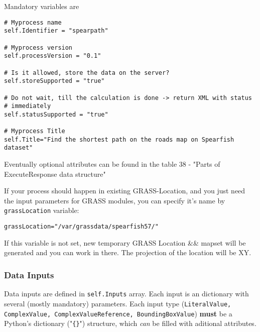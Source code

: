 \documentclass[a4paper,11pt]{article}
\begin{document}
     
    Mandatory variables are
     

    \begin{verbatim}
# Myprocess name
self.Identifier = "spearpath"

# Myprocess version
self.processVersion = "0.1"

# Is it allowed, store the data on the server?
self.storeSupported = "true"

# Do not wait, till the calculation is done -> return XML with status
# immediately
self.statusSupported = "true"

# Myprocess Title
self.Title="Find the shortest path on the roads map on Spearfish dataset"
    \end{verbatim}

     
    Eventually optional attributes can be found in the table 38 - "Parts of
    ExecuteResponse data structure"
     

     
    If your process should happen in existing GRASS-Location, and you just need
    the input parameters for GRASS modules, you can specify it's name by
    \texttt{grassLocation} variable:
     

    \begin{verbatim}
grassLocation="/var/grassdata/spearfish57/"
    \end{verbatim}

     
If this variable is not set, new temporary GRASS Location \&\& mapset will be
generated and you can work in there. The projection of the location will be
XY.
     


    \subsubsection{Data Inputs}
     
    Data inputs are defined in \texttt{self.Inputs} array. Each input is an dictionary with
    several (mostly mandatory) parameters. Each input type
    (\texttt{LiteralValue, ComplexValue, ComplexValueReference,
    BoundingBoxValue}) \textbf{must} be a Python's dictionary
    ("\texttt{\{\}}") structure, which \emph{can} be filled with aditional
    attributes.
     
\end{document}
